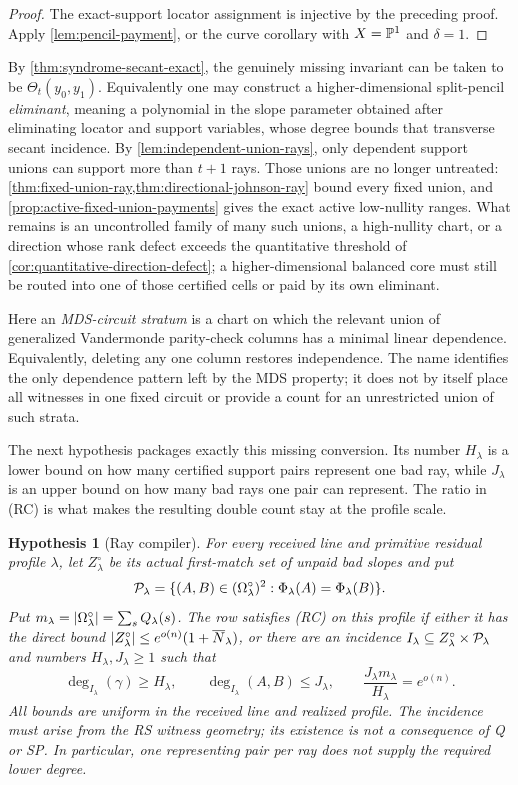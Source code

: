 \documentclass[11pt,a4paper]{amsart}
\numberwithin{equation}{section}
\newtheorem{hypothesis}[theorem]{Hypothesis}
\theoremstyle{remark}
\begin{document}
\begin{proof}
The exact-support locator assignment is injective by the preceding proof.
Apply \cref{lem:pencil-payment}, or the curve corollary with
\(X=\mathbb P^1\) and \(\delta=1\).
\end{proof}

By \cref{thm:syndrome-secant-exact}, the genuinely missing invariant can
be taken to be \(\Theta_t(y_0,y_1)\).  Equivalently one may construct a
higher-dimensional split-pencil \emph{eliminant}, meaning a polynomial in
the slope parameter obtained after eliminating locator and support
variables, whose degree bounds that transverse secant incidence.  By
\cref{lem:independent-union-rays}, only dependent support unions can
support more than \(t+1\) rays.  Those unions are no longer untreated:
\cref{thm:fixed-union-ray,thm:directional-johnson-ray} bound every fixed
union, and \cref{prop:active-fixed-union-payments} gives the exact active
low-nullity ranges.  What remains is an uncontrolled family of many such
unions, a high-nullity chart, or a direction whose rank defect exceeds the
quantitative threshold of \cref{cor:quantitative-direction-defect}; a
higher-dimensional balanced core must still be routed into one of those
certified cells or paid by its own eliminant.

Here an \emph{MDS-circuit stratum} is a chart on which the relevant union
of generalized Vandermonde parity-check columns has a minimal linear
dependence.  Equivalently, deleting any one column restores independence.
The name identifies the only dependence pattern left by the MDS property;
it does not by itself place all witnesses in one fixed circuit or provide
a count for an unrestricted union of such strata.

The next hypothesis packages exactly this missing conversion.  Its number
\(H_\lambda\) is a lower bound on how many certified support pairs represent
one bad ray, while \(J_\lambda\) is an upper bound on how many bad rays one
pair can represent.  The ratio in \textup{(RC)} is what makes the resulting
double count stay at the profile scale.

\begin{hypothesis}[Ray compiler]\label{hyp:ray-compiler}
For every received line and primitive residual profile \(\lambda\), let
\(Z_\lambda^\circ\) be its actual first-match set of unpaid bad slopes and
put
\[
\mathcal P_\lambda=\{(A,B)\in(\Omega^{\circ}_\lambda)^2:
                       \Phi_\lambda(A)=\Phi_\lambda(B)\}.
\]
Put \(m_\lambda=\lvert \Omega^{\circ}_\lambda\rvert=\sum_sQ_\lambda(s)\).
The row satisfies \textup{(RC)} on this profile if either it has the direct
bound \(\lvert Z_\lambda^\circ\rvert\le e^{o(n)}(1+\overline N_\lambda)\), or there are
an incidence
\(I_\lambda\subseteq Z_\lambda^\circ\times\mathcal P_\lambda\) and numbers
\(H_\lambda,J_\lambda\ge1\) such that
\[
 \deg_{I_\lambda}(\gamma)\ge H_\lambda,\qquad
 \deg_{I_\lambda}(A,B)\le J_\lambda,\qquad
 \frac{J_\lambda m_\lambda}{H_\lambda}=e^{o(n)}.
 \tag{RC}\label{eq:ray-compiler}
\]
All bounds are uniform in the received line and realized profile.  The
incidence must arise from the RS witness geometry; its existence is not a
consequence of Q or SP.  In particular, one representing pair per ray does
not supply the required lower degree.
\end{hypothesis}
\end{document}
